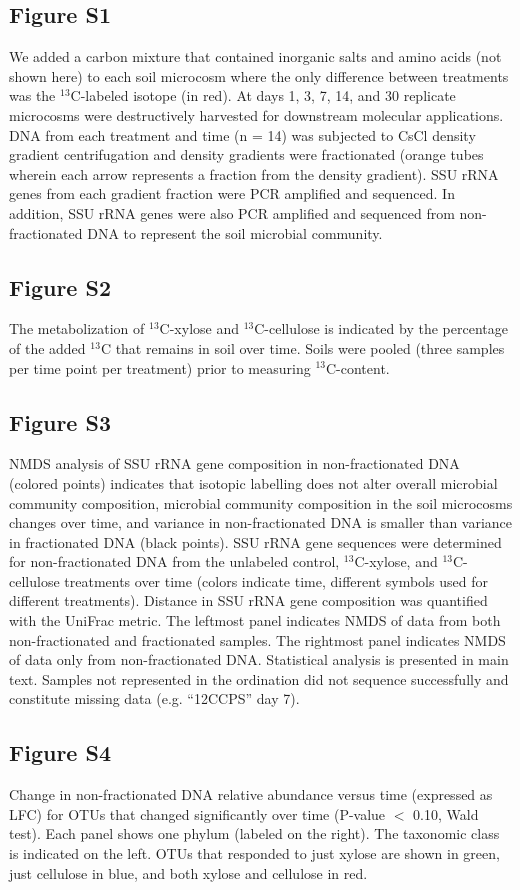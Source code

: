 \subsection{Figure S1}
We added a carbon mixture that contained inorganic
salts and amino acids (not shown here) to each soil microcosm where the
only difference between treatments was the $^{13}$C-labeled isotope (in red). At days
1, 3, 7, 14, and 30 replicate microcosms were destructively harvested for
downstream molecular applications. DNA from each treatment and time (n = 14)
was subjected to CsCl density gradient centrifugation and density gradients
were fractionated (orange tubes wherein each arrow represents a fraction from
the density gradient). SSU rRNA genes from each gradient fraction were PCR
amplified and sequenced. In addition, SSU rRNA genes were also PCR amplified
and sequenced from non-fractionated DNA to represent the soil microbial
community.

\subsection{Figure S2}
The metabolization of $^{13}$C-xylose and $^{13}$C-cellulose is indicated by
the percentage of the added $^{13}$C that remains in soil over time. Soils
were pooled (three samples per time point per treatment) prior to measuring
$^{13}$C-content.
\subsection{Figure S3}
NMDS analysis of SSU rRNA gene composition in non-fractionated DNA (colored points) indicates
that isotopic labelling does not alter overall microbial community composition,
microbial community composition in the soil microcosms changes over time, and
variance in non-fractionated DNA is smaller than variance in fractionated DNA (black points).
SSU rRNA gene sequences were determined for non-fractionated DNA from the
unlabeled control, $^{13}$C-xylose, and $^{13}$C-cellulose treatments over time (colors
indicate time, different symbols used for different treatments). Distance in SSU
rRNA gene composition was quantified with the UniFrac metric. The
leftmost panel indicates NMDS of data from both non-fractionated and
fractionated samples. The rightmost panel indicates NMDS of data only from
non-fractionated DNA. Statistical analysis is presented in main text. Samples not
represented in the ordination did not sequence successfully and constitute
missing data (e.g. ``12CCPS'' day 7).
\subsection{Figure S4}
Change in non-fractionated DNA relative abundance versus time (expressed
as LFC) for OTUs that changed significantly over time (P-value $<$ 0.10, Wald test).
Each panel shows one phylum (labeled on the right). The taxonomic class is
indicated on the left. OTUs that responded to just xylose are shown in 
green, just cellulose in blue, and both xylose and cellulose in red.  

